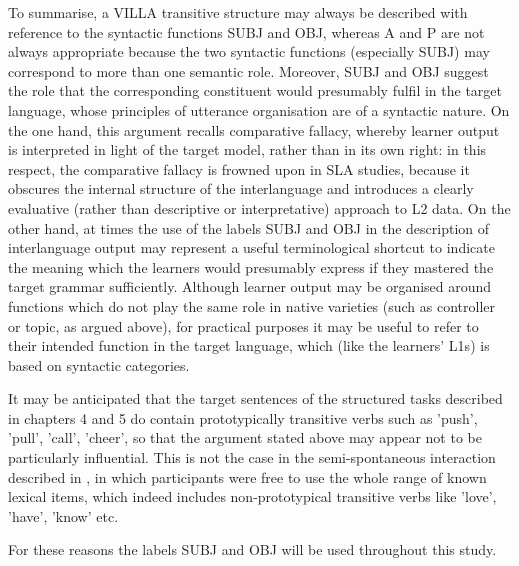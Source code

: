 To summarise, a VILLA transitive structure may always be described with reference to the syntactic functions SUBJ and OBJ, whereas A and P are not always appropriate because the two syntactic functions (especially SUBJ) may correspond to more than one semantic role. Moreover, SUBJ and OBJ suggest the role that the corresponding constituent would presumably fulfil in the target language, whose principles of utterance organisation are of a syntactic nature. On the one hand, this argument recalls  comparative fallacy, whereby learner output is interpreted in light of the target model, rather than in its own right: in this respect, the comparative fallacy is frowned upon in SLA studies, because it obscures the internal structure of the interlanguage and introduces a clearly evaluative (rather than descriptive or interpretative) approach to L2 data. On the other hand, at times the use of the labels SUBJ and OBJ in the description of interlanguage output may represent a useful terminological shortcut to indicate the meaning which the learners would presumably express if they mastered the target grammar sufficiently. Although learner output may be organised around functions which do not play the same role in native varieties (such as controller or topic, as argued above), for practical purposes it may be useful to refer to their intended function in the target language, which (like the learners’ L1s) is based on syntactic categories.

It may be anticipated that the target sentences of the structured tasks described in chapters 4 and 5 do contain prototypically transitive verbs such as 'push', 'pull', 'call', 'cheer', so that the argument stated above may appear not to be particularly influential. This is not the case in the semi-spontaneous interaction described in , in which participants were free to use the whole range of known lexical items, which indeed includes non-prototypical transitive verbs like 'love', 'have', 'know' etc.

For these reasons the labels SUBJ and OBJ will be used throughout this study. 
